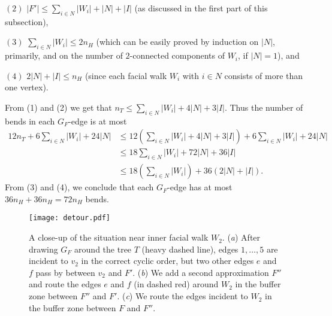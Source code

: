 \documentclass{llncs}
\newcommand{\remove}[1]{}
\begin{document}
$(2)$ $|F'| \leq \sum_{i\in N} |W_i| + |N| + |I|$ (as discussed in the first part of this subsection),

 


$(3)$ $\sum_{i\in N} |W_i| \leq 2n_H$ (which can be easily proved by induction on $|N|$, primarily, and on the number of $2$-connected components of $W_i$, if $|N|=1$), and




 $(4)$ $2|N| + |I| \leq n_H$ (since each facial walk $W_i$ with $i\in N$ consists of more than one vertex).
 

\remove{In order to derive a bound in terms of $n_H=|V(H)|$, we use $(1)$ $n_T = |F'| + 3b-4$ (as discussed in the first part of this subsection), $(2)$ $|F|=\sum_{i\in N} |W_i| + |I| \leq 2n_H$, $(3)$ $b = |N| + |I|$, $(4)$ $2|N| + |I| \leq n_H$ (since each facial walk $W_i$ with $i\in N$ consists of more than one vertex), and $(5)$ $|F'| \leq 3/2 \sum_{i\in N} |W_i| + |I|$ (as discussed in the first part of this subsection).
}

From (1) and (2) we get that $n_T \leq \sum_{i\in N} |W_i| + 4|N| + 3|I|$.
Thus the number of bends in each $G_F$-edge is at most
\begin{align*}
12n_T + 6\sum_{i\in N} |W_i| + 24|N|
&\leq 12( \sum_{i\in N} |W_i| + 4|N| + 3|I|) + 6\sum_{i\in N} |W_i| + 24|N| \\
&\leq 18 \sum_{i\in N} |W_i| + 72 |N| + 36 |I| \\
&\leq 18 (\sum_{i\in N} |W_i|) + 36 (2|N| + |I|).
\end{align*}
From (3) and (4), we conclude that each $G_F$-edge has at most $36n_H + 36 n_H = 72 n_H$ bends.







\begin{figure}[tb]\centering
\texttt{[image: detour.pdf]}
\caption{A close-up of the situation near inner facial walk $W_2$.
(\emph{a}) After drawing $G_F$ around the tree $T$ (heavy dashed line), edges
$1, \ldots, 5$ are incident to $v_2$ in the correct cyclic order, but two other edges $e$ and $f$  pass by between $v_2$ and $F'$.
(\emph{b})  We add a second approximation $F''$ and route the edges $e$ and $f$ (in dashed red) around $W_2$  in the buffer zone between $F''$ and $F'$.
(\emph{c})  We route the edges incident to $W_2$ in the buffer zone between $F$ and $F''$.}
\label{fig:route23}
\end{figure}
\end{document}
